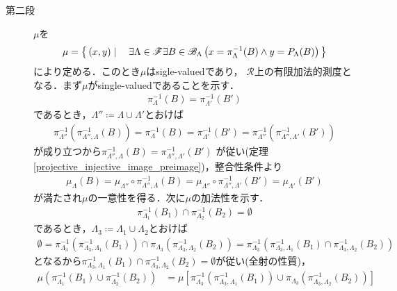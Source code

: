 \begin{prf}
\begin{description}
			\item[第二段]
				$\mu$を
				\begin{align}
					\mu = \left\{\, (x,y) \mid \quad \exists \Lambda \in \mathscr{F}
					\exists B \in \mathscr{B}_\Lambda
					\left(x=\pi_\Lambda^{-1}(B) \wedge y = P_\Lambda(B)\right)\, \right\}
				\end{align}
				により定める．このとき$\mu$はsigle-valuedであり，
				$\mathscr{R}$上の有限加法的測度となる．まず$\mu$がsingle-valuedであることを示す．
				\begin{align}
					\pi_\Lambda^{-1}(B) = \pi_{\Lambda'}^{-1}(B')
				\end{align}
				であるとき，$\Lambda'' \coloneqq \Lambda \cup \Lambda'$とおけば
				\begin{align}
					\pi_{\Lambda''}^{-1}\left( \pi_{\Lambda'',\Lambda}^{-1}(B) \right)
					= \pi_\Lambda^{-1}(B)
					= \pi_{\Lambda'}^{-1}(B')
					= \pi_{\Lambda''}^{-1}\left( \pi_{\Lambda'',\Lambda'}^{-1}(B') \right)
				\end{align}
				が成り立つから$\pi_{\Lambda'',\Lambda}^{-1}(B) = \pi_{\Lambda'',\Lambda'}^{-1}(B')$
				が従い(定理\ref{projective_injective_image_preimage})，整合性条件より
				\begin{align}
					\mu_\Lambda(B) 
					= \mu_{\Lambda''} \circ \pi_{\Lambda'',\Lambda}^{-1}(B)
					= \mu_{\Lambda''} \circ \pi_{\Lambda'',\Lambda'}^{-1}(B')
					= \mu_{\Lambda'}(B')
				\end{align}
				が満たされ$\mu$の一意性を得る．次に$\mu$の加法性を示す．
				\begin{align}
					\pi_{\Lambda_1}^{-1}(B_1) \cap \pi_{\Lambda_2}^{-1}(B_2) = \emptyset
				\end{align}
				であるとき，$\Lambda_3 \coloneqq \Lambda_1 \cup \Lambda_2$とおけば
				\begin{align}
					\emptyset 
					= \pi_{\Lambda_3}^{-1}\left( \pi_{\Lambda_3,\Lambda_1}^{-1}(B_1) \right)
					\cap \pi_{\Lambda_3}\left( \pi_{\Lambda_3,\Lambda_2}^{-1}(B_2) \right)
					= \pi_{\Lambda_3}^{-1}\left( \pi_{\Lambda_3,\Lambda_1}^{-1}(B_1) \cap \pi_{\Lambda_3,\Lambda_2}^{-1}(B_2) \right)
				\end{align}
				となるから$\pi_{\Lambda_3,\Lambda_1}^{-1}(B_1) \cap \pi_{\Lambda_3,\Lambda_2}^{-1}(B_2)
				= \emptyset$が従い(全射の性質)，
				\begin{align}
					\mu\left( \pi_{\Lambda_1}^{-1}(B_1) \cup \pi_{\Lambda_2}^{-1}(B_2) \right)
					&= \mu\left[\pi_{\Lambda_3}^{-1}\left( \pi_{\Lambda_3,\Lambda_1}^{-1}(B_1) \right)
					\cup \pi_{\Lambda_3}\left( \pi_{\Lambda_3,\Lambda_2}^{-1}(B_2) \right) \right] \\

\end{align}
\end{description}
\end{prf}
